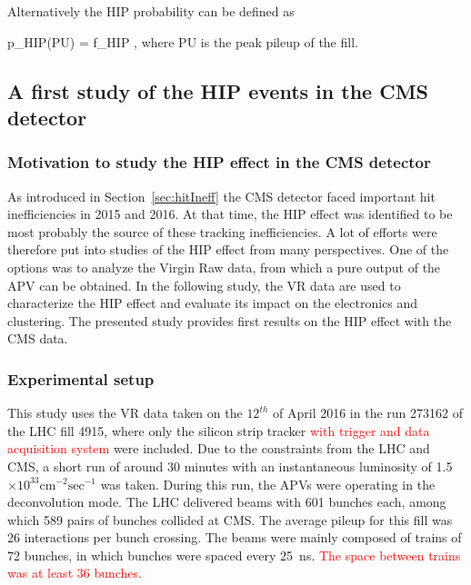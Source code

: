 Alternatively the HIP probability can be defined as

{
p_{HIP}(PU) = f_{HIP} ,
}
where PU is the peak pileup of the fill. 



\subsection{A first study of the HIP events in the CMS detector~\label{sec:firstStudy}}

\subsubsection{Motivation to study the HIP effect in the CMS detector}

As introduced in Section~\ref{sec:hitIneff} the CMS detector faced important hit inefficiencies in 2015 and 2016. At that time, the HIP effect was identified to be most probably the source of these tracking inefficiencies. A lot of efforts were therefore put into studies of the HIP effect from many perspectives. One of the options was to analyze the Virgin Raw data, from which a pure output of the APV can be obtained. In the following study, the VR data are used to characterize the HIP effect and evaluate its impact on the electronics and clustering. The presented study provides first results on the HIP effect with the CMS data.

\subsubsection{Experimental setup} 

This study uses the VR data taken on the $12^{th}$ of April 2016 in the run 273162 of the LHC fill 4915, where only the silicon strip tracker\textcolor{red}{ with trigger and data acquisition system} were included. Due to the constraints from the LHC and CMS, a short run of around 30 minutes with an instantaneous luminosity of 1.5$\times 10^{33} \mathrm{cm^{-2} sec^{-1}}$ was taken. During this run, the APVs were operating in the deconvolution mode. The LHC delivered beams with 601 bunches each, among which 589 pairs of bunches collided at CMS. The average pileup for this fill was 26 interactions per bunch crossing. The beams were mainly composed of trains of 72 bunches, in which bunches were spaced every 25~ns. \textcolor{red}{The space between trains was at least 36 bunches.}

